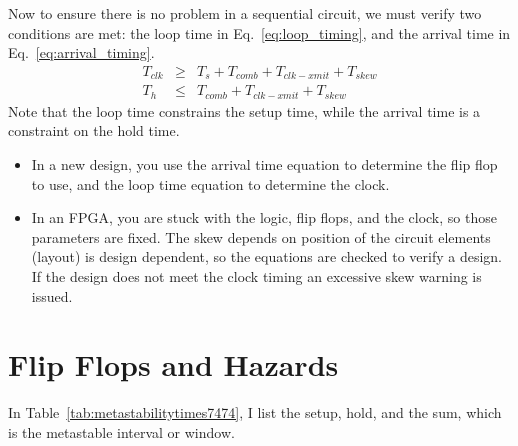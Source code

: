 Now to ensure there is no problem in a sequential circuit, we must verify two conditions are met: the loop time in Eq.~\ref{eq:loop_timing}, and the arrival time in Eq.~\ref{eq:arrival_timing}.
\begin{eqnarray}
T_{clk} &\geq& T_s+T_{comb}+T_{clk-xmit}+T_{skew} \label{eq:loop_timing}\\
T_h     &\leq& T_{comb}+T_{clk-xmit}+T_{skew} \label{eq:arrival_timing}
\end{eqnarray}
Note that the loop time constrains the setup time, while the arrival time is a constraint on the hold time.  
\begin{itemize}
\item In a new design, you use the arrival time equation to determine the flip flop to use, and the loop time equation to determine the clock.
\item In an FPGA, you are stuck with the logic, flip flops, and the clock, so those parameters are fixed. The skew depends on position of the circuit elements (layout) is design dependent, so the equations are checked to verify a design.  If the design does not meet the clock timing an excessive skew warning is issued.
\end{itemize}

\section{Flip Flops and Hazards}

In Table~\ref{tab:metastabilitytimes7474}, I list the setup, hold, and the sum, which is the metastable interval or window.

